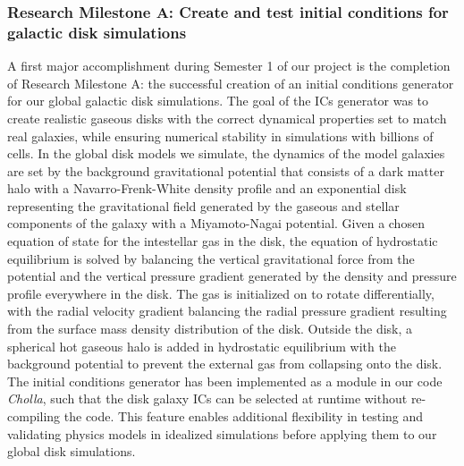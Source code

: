 \documentclass[11pt,letterpaper,english]{article}
\begin{document}
\subsubsection{Research Milestone A: Create and test initial conditions for galactic disk simulations}

A first major accomplishment during Semester 1 of our project is the completion of Research Milestone A: the successful creation of an initial conditions generator for our global galactic disk simulations. The goal of the ICs generator was to 
create realistic gaseous disks with the correct dynamical properties set to match real galaxies, while
ensuring numerical stability in simulations with billions of cells.  
In the global disk models we simulate, the dynamics of the model galaxies are set by the background
gravitational potential that consists of a dark matter halo with a Navarro-Frenk-White density profile and
an exponential disk representing the gravitational field generated by the gaseous and stellar components of the galaxy with a Miyamoto-Nagai potential. Given a chosen equation of state for the intestellar gas
in the disk, the equation of hydrostatic equilibrium is solved by balancing the vertical gravitational force from the potential and the vertical pressure gradient generated by the density and pressure profile everywhere in the disk. The gas is initialized on to rotate differentially, with the radial velocity
gradient balancing the radial pressure gradient resulting from the surface mass density distribution
of the disk. Outside the disk, a spherical hot gaseous halo is added in hydrostatic equilibrium with the
background potential to prevent the external gas from collapsing onto the disk. The initial conditions
generator has been implemented as a module in our code \textit{Cholla}, such that the disk galaxy ICs
can be selected at runtime without re-compiling the code. This feature enables additional flexibility
in testing and validating physics models in idealized simulations before applying them to our global
disk simulations.
~\\~\\
\end{document}
